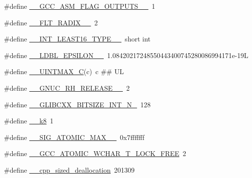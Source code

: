 \begin{DoxyCompactItemize}
\item 
\#define \hyperlink{cmake-build-debug_2babel__client__autogen_2moc__predefs_8h_a4a20b2c078ee12e2be450e83e5dacc9d}{\+\_\+\+\_\+\+G\+C\+C\+\_\+\+A\+S\+M\+\_\+\+F\+L\+A\+G\+\_\+\+O\+U\+T\+P\+U\+T\+S\+\_\+\+\_\+}~1
\item 
\#define \hyperlink{cmake-build-debug_2babel__client__autogen_2moc__predefs_8h_ae9ed936cc90c092e15526478bdbbefe0}{\+\_\+\+\_\+\+F\+L\+T\+\_\+\+R\+A\+D\+I\+X\+\_\+\+\_\+}~2
\item 
\#define \hyperlink{cmake-build-debug_2babel__client__autogen_2moc__predefs_8h_a6f2032bd7e6248b526a2c13e37c7b972}{\+\_\+\+\_\+\+I\+N\+T\+\_\+\+L\+E\+A\+S\+T16\+\_\+\+T\+Y\+P\+E\+\_\+\+\_\+}~short int
\item 
\#define \hyperlink{cmake-build-debug_2babel__client__autogen_2moc__predefs_8h_ad7a5615aea1516ee885112456cf695e8}{\+\_\+\+\_\+\+L\+D\+B\+L\+\_\+\+E\+P\+S\+I\+L\+O\+N\+\_\+\+\_\+}~1.\+08420217248550443400745280086994171e-\/19L
\item 
\#define \hyperlink{cmake-build-debug_2babel__client__autogen_2moc__predefs_8h_aee4eb3a89493f1c9251a5a52f700f21d}{\+\_\+\+\_\+\+U\+I\+N\+T\+M\+A\+X\+\_\+C}(c)~c \#\# UL
\item 
\#define \hyperlink{cmake-build-debug_2babel__client__autogen_2moc__predefs_8h_a4d3dfac4e5b8587ac8ce0505e918a9d6}{\+\_\+\+\_\+\+G\+N\+U\+C\+\_\+\+R\+H\+\_\+\+R\+E\+L\+E\+A\+S\+E\+\_\+\+\_\+}~2
\item 
\#define \hyperlink{cmake-build-debug_2babel__client__autogen_2moc__predefs_8h_a059c92544effeec0d7fac0fd1f14e697}{\+\_\+\+\_\+\+G\+L\+I\+B\+C\+X\+X\+\_\+\+B\+I\+T\+S\+I\+Z\+E\+\_\+\+I\+N\+T\+\_\+\+N\+\_}~128
\item 
\#define \hyperlink{cmake-build-debug_2babel__client__autogen_2moc__predefs_8h_a9b10b4191fdb9929f3210b21744efc41}{\+\_\+\+\_\+k8}~1
\item 
\#define \hyperlink{cmake-build-debug_2babel__client__autogen_2moc__predefs_8h_a9e75b72378b039587e4fc4006776826d}{\+\_\+\+\_\+\+S\+I\+G\+\_\+\+A\+T\+O\+M\+I\+C\+\_\+\+M\+A\+X\+\_\+\+\_\+}~0x7fffffff
\item 
\#define \hyperlink{cmake-build-debug_2babel__client__autogen_2moc__predefs_8h_a775d1a831fa88d8c38c76d31947a8ebf}{\+\_\+\+\_\+\+G\+C\+C\+\_\+\+A\+T\+O\+M\+I\+C\+\_\+\+W\+C\+H\+A\+R\+\_\+\+T\+\_\+\+L\+O\+C\+K\+\_\+\+F\+R\+EE}~2
\item 
\#define \hyperlink{cmake-build-debug_2babel__client__autogen_2moc__predefs_8h_a38782886ef0f9d68b695bcec1f396f38}{\+\_\+\+\_\+cpp\+\_\+sized\+\_\+deallocation}~201309

\end{DoxyCompactItemize}
